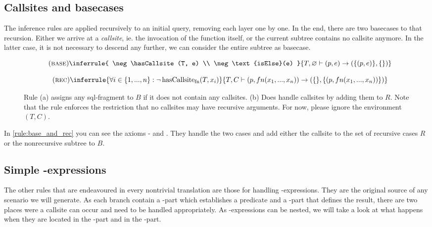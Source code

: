 \subsection{Callsites and basecases}
The inference rules are applied recursively to an initial query, removing each layer one by one. In the end, there are two basecases to that recursion. Either we arrive at a \textit{callsite}, ie. the invocation of the function itself, or the current subtree contains no callsite anymore. In the latter case, it is not necessary to descend any further, we can consider the entire subtree as basecase.

\begin{figure}[h]
    \begin{minipage}[b]{.5\linewidth}
    \centering %
$$\quad(\textsc{base})\inferrule{
   \neg \hasCallsite(T, e) \\
   \neg \text{isElse}(e)
}{
    T, \varnothing \vdash (p, e) \rightarrow (\{(p, e)\},\{\})
}$$
    \subcaption{}\label{rule:base}
    \end{minipage}\hfill
    \begin{minipage}[b]{.5\linewidth}
    \centering %
$$\quad(\textsc{rec})\inferrule{
   \forall i \in \{1, ..., n\} : \neg \hasCallsite(T, x_i)
}{
    T, C \vdash (p, fn(x_1, ..., x_n)) \rightarrow (\{\}, \{(p, fn(x_1, ..., x_n))\})
}$$
    \label{rule:rec}
    \end{minipage}
    \caption{Rule (a) assigns any sql-fragment to $B$ if it does not contain any callsites. (b) Does handle callsites by adding them to $R$. Note that the rule enforces the restriction that no callsites may have recursive arguments. For now, please ignore the environment $(T, C)$.}\label{rule:base_and_rec}
\end{figure}

In \autoref{rule:base_and_rec} you can see the axioms \RREC- and \RBASE. They handle the two cases and add either the callsite to the set of recursive cases $R$ or the nonrecursive subtree to $B$.



\subsection{Simple \CASE-expressions}

The other rules that are endeavoured in every nontrivial translation are those for handling \CASE-expressions. They are the original source of any scenario we will generate. As each branch contain a \WHEN-part which establishes a predicate and a \THEN-part that defines the result, there are two places were a callsite can occur and need to be handled appropriately. As \CASE-expressions can be nested, we will take a look at what happens when they are located in the \WHEN-part and in the \THEN-part.

